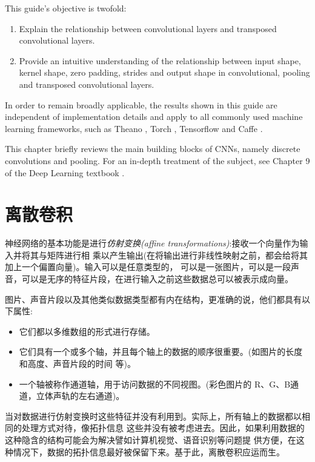 \documentclass[notitlepage]{report}
\begin{document}
This guide's objective is twofold:

\begin{enumerate}
    \item Explain the relationship between convolutional layers and transposed
        convolutional layers.
    \item Provide an intuitive understanding of the relationship between input
        shape, kernel shape, zero padding, strides and output shape in
        convolutional, pooling and transposed convolutional layers.
\end{enumerate}

In order to remain broadly applicable, the results shown in this guide are
independent of implementation details and apply to all commonly used machine
learning frameworks, such as Theano
\citep{bergstra2010theano,bastien2012theano}, Torch \citep{collobert2011torch7},
Tensorflow \citep{abaditensorflow} and Caffe \citep{jia2014caffe}.

This chapter briefly reviews the main building blocks of CNNs, namely discrete
convolutions and pooling. For an in-depth treatment of the subject, see Chapter
9 of the Deep Learning textbook \citep{Goodfellow-et-al-2016-Book}.

\section{离散卷积}
神经网络的基本功能是进行\emph{仿射变换(affine transformations)}:接收一个向量作为输入并将其与矩阵进行相
乘以产生输出(在将输出进行非线性映射之前，都会给将其加上一个偏置向量)。输入可以是任意类型的，
可以是一张图片，可以是一段声音，可以是无序的特征片段，在进行输入之前这些数据总可以被表示成向量。

图片、声音片段以及其他类似数据类型都有内在结构，更准确的说，他们都具有以下属性:

\begin{itemize}
    \item 它们都以多维数组的形式进行存储。
    \item 它们具有一个或多个轴，并且每个轴上的数据的顺序很重要。(如图片的长度和高度、声音片段的时间
          等)。
    \item 一个轴被称作通道轴，用于访问数据的不同视图。(彩色图片的 R、G、B通道，立体声轨的左右通道)。
\end{itemize}

当对数据进行仿射变换时这些特征并没有利用到。实际上，所有轴上的数据都以相同的处理方式对待，像拓扑信息
这些并没有被考虑进去。因此，如果利用数据的这种隐含的结构可能会为解决譬如计算机视觉、语音识别等问题提
供方便，在这种情况下，数据的拓扑信息最好被保留下来。基于此，离散卷积应运而生。
\end{document}
